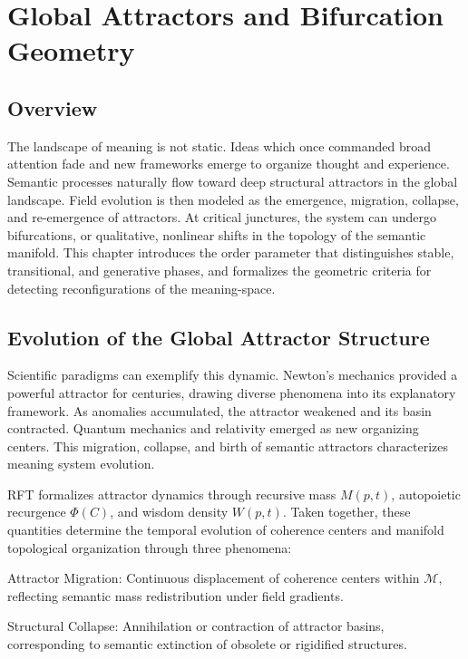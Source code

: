 \chapter{Global Attractors and Bifurcation Geometry}

\section{Overview}

The landscape of meaning is not static. Ideas which once commanded broad attention fade and new frameworks emerge to organize thought and experience. Semantic processes naturally flow toward deep structural attractors in the global landscape. Field evolution is then modeled as the emergence, migration, collapse, and re-emergence of attractors. At critical junctures, the system can undergo bifurcations, or qualitative, nonlinear shifts \autocite{Poincare1892, Thom1975} in the topology of the semantic manifold. This chapter introduces the order parameter that distinguishes stable, transitional, and generative phases, and formalizes the geometric criteria for detecting reconfigurations of the meaning-space.

\section{Evolution of the Global Attractor Structure}

Scientific paradigms can exemplify this dynamic. Newton's mechanics provided a powerful attractor for centuries, drawing diverse phenomena into its explanatory framework. As anomalies accumulated, the attractor weakened and its basin contracted. Quantum mechanics and relativity emerged as new organizing centers. This migration, collapse, and birth of semantic attractors characterizes meaning system evolution.

RFT formalizes attractor dynamics through recursive mass \(M(p,t)\), autopoietic recurgence \(\Phi(C)\), and wisdom density \(W(p,t)\). Taken together, these quantities determine the temporal evolution of coherence centers and manifold topological organization through three phenomena:

Attractor Migration: Continuous displacement of coherence centers within \(\mathcal{M}\), reflecting semantic mass redistribution under field gradients.

Structural Collapse: Annihilation or contraction of attractor basins, corresponding to semantic extinction of obsolete or rigidified structures.

